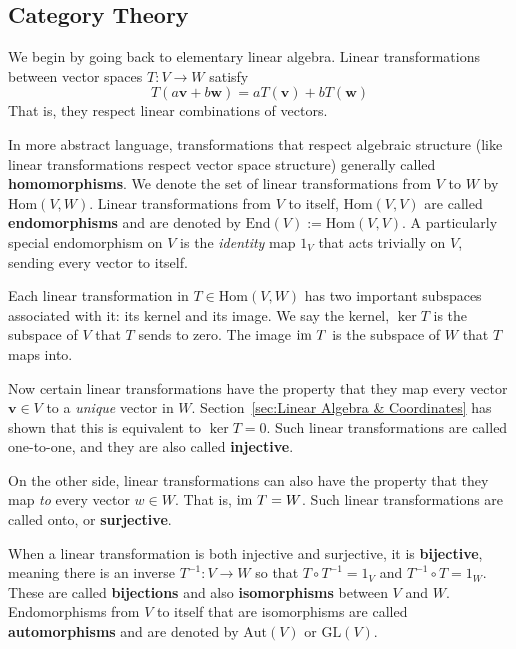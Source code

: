 \begin{appendices}
	

\appendixpage
\noappendicestocpagenum

\chapter*{Category Theory}

	We begin by going back to elementary linear algebra. Linear transformations between vector spaces $T: V \rightarrow W$ satisfy 
	\begin{equation}
		T(a \mathbf v + b \mathbf w) = a T(\mathbf v) + b T(\mathbf w)
	\end{equation}
	That is, they respect linear combinations of vectors.

	In more abstract language, transformations that respect algebraic structure (like linear transformations respect vector space structure) generally called \textbf{homomorphisms}. We denote the set of linear transformations from $V$ to $W$ by $\text{Hom}(V,W)$. Linear transformations from $V$ to itself, $\text{Hom}(V,V)$ are called \textbf{endomorphisms} and are denoted by $\text{End}(V):= \text{Hom}(V,V)$. A particularly special endomorphism on $V$ is the \emph{identity} map $1_V$ that acts trivially on $V$, sending every vector to itself.
	
	
	Each linear transformation in $T \in \text{Hom}(V,W)$ has two important subspaces associated with it: its kernel and its image. We say the kernel, $\ker T$ is the subspace of $V$ that $T$ sends to zero. The image $\text{im} ~ T$ is the subspace of $W$ that $T$ maps into.
		
	Now certain linear transformations have the property that they map every vector $\mathbf v \in V$ to a \emph{unique} vector in $W$. Section~\ref{sec:Linear Algebra & Coordinates} has shown that this is equivalent to $\ker T = 0$. Such linear transformations are called one-to-one, and they are also called \textbf{injective}. 
	
	On the other side, linear transformations can also have the property that they map \emph{to} every vector $w \in W$. That is, $\text{im}~T = W$. Such linear transformations are called onto, or \textbf{surjective}.
	
	When a linear transformation is both injective and surjective, it is \textbf{bijective}, meaning there is an inverse $T^{-1}:V \rightarrow W$ so that $T\circ T^{-1} = 1_V$ and $T^{-1} \circ T = 1_W$. These are called \textbf{bijections} and also \textbf{isomorphisms} between $V$ and $W$. Endomorphisms from $V$ to itself that are isomorphisms are called \textbf{automorphisms} and are denoted by $\text{Aut}(V)$ or $\mathrm{GL}(V)$. 


\end{appendices}

